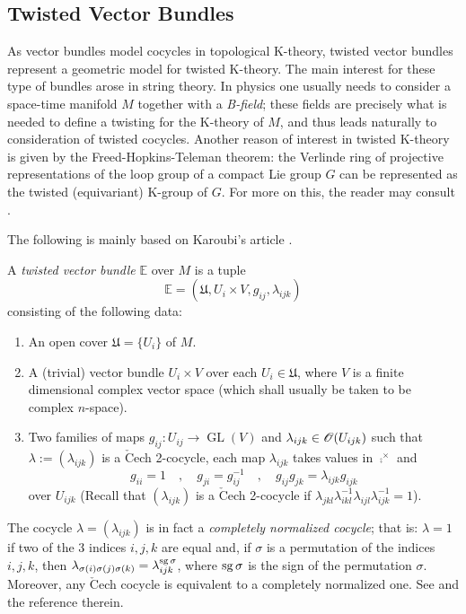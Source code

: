 \subsection{Twisted Vector Bundles}

As vector bundles model cocycles in topological K-theory, twisted vector bundles represent a geometric model for twisted K-theory. The main interest for these type of bundles arose in string theory. In physics one usually needs to consider a space-time manifold $M$ together with a \emph{B-field}; these fields are precisely what is needed to define a twisting for the K-theory of $M$, and thus leads naturally to consideration of twisted cocycles. Another reason of interest in twisted K-theory is given by the Freed-Hopkins-Teleman theorem: the Verlinde ring of projective representations of the loop group of a compact Lie group $G$ can be represented as the twisted (equivariant) K-group of $G$. For more on this, the reader may consult \cite{atiyah-segal:twisted_k}.

The following is mainly based on Karoubi's article \cite{karoubi:twisted_vector}.

\begin{defi}
A \emph{twisted vector bundle} $\mathbb{E}$ over $M$ is a tuple
$$\mathbb{E}=(\mathfrak{U},U_i\times V,g_{ij},\lambda_{ijk})$$
consisting of the following data:
\begin{enumerate}
\item An open cover $\mathfrak{U}=\{U_i\}$ of $M$.
\item A (trivial) vector bundle $U_i\times V$ over each $U_i\in \mathfrak{U}$, where $V$ is a finite dimensional complex vector space (which shall usually be taken to be complex $n$-space).
\item Two families of maps $g_{ij}:U_{ij}\to \operatorname{GL}(V)$ and $\lambda_{ijk}\in \mathscr{O}(U_{ijk})$ such that $\lambda :=(\lambda_{ijk})$ is a $\check{\text{C}}$ech 2-cocycle, each map $\lambda_{ijk}$ takes values in $\comp^\times$ and
$$g_{ii}=1 \quad ,\quad g_{ji}=g_{ij}^{-1} \quad , \quad g_{ij}g_{jk}=\lambda_{ijk}g_{ijk}$$
over $U_{ijk}$ (Recall that $(\lambda_{ijk})$ is a $\check{\text{C}}$ech 2-cocycle if $\lambda_{jkl}\lambda_{ikl}^{-1}\lambda_{ijl}\lambda_{ijk}^{-1}=1$).
\end{enumerate}
\end{defi}

\begin{obs}
The cocycle $\lambda =(\lambda_{ijk})$ is in fact a \emph{completely normalized cocycle}; that is: $\lambda =1$ if two of the 3 indices $i,j,k$ are equal and, if $\sigma$ is a permutation of the indices $i,j,k$, then $\lambda_{\sigma (i)\sigma (j) \sigma (k)}=\lambda_{ijk}^{\operatorname{sg}\sigma}$, where $\operatorname{sg}\sigma$ is the sign of the permutation $\sigma$. Moreover, any $\check{\text{C}}$ech cocycle is equivalent to a completely normalized one. See  \cite{karoubi:twisted_vector} and the reference therein.
\end{obs}

